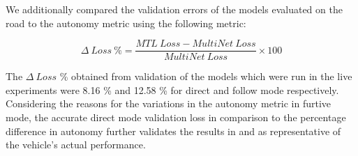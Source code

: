 We additionally compared the validation errors of the models evaluated on the road to the autonomy metric using the following metric:

\begin{equation}
\Delta\ Loss\ \% = \dfrac{MTL\ Loss - MultiNet\ Loss}{MultiNet\ Loss} \times 100
\end{equation}

The $\Delta \ Loss$ \% obtained from validation of the models which were run in the live experiments were 8.16 \% and  12.58 \% for direct and follow mode respectively. Considering the reasons for the variations in the autonomy metric in furtive mode, the accurate direct mode validation loss in comparison to the percentage difference in autonomy further validates the results in  and  as representative of the vehicle's actual performance.
